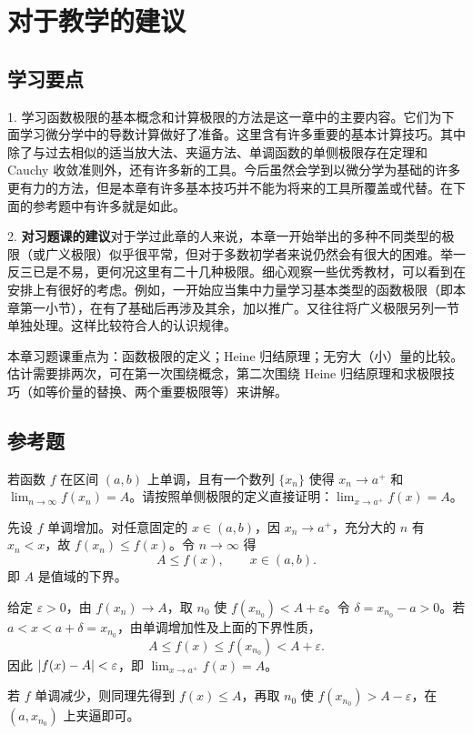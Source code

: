 \section{对于教学的建议}

\subsection{学习要点}

1. 学习函数极限的基本概念和计算极限的方法是这一章中的主要内容。它们为下面学习微分学中的导数计算做好了准备。这里含有许多重要的基本计算技巧。其中除了与过去相似的适当放大法、夹逼方法、单调函数的单侧极限存在定理和 Cauchy 收敛准则外，还有许多新的工具。今后虽然会学到以微分学为基础的许多更有力的方法，但是本章有许多基本技巧并不能为将来的工具所覆盖或代替。在下面的参考题中有许多就是如此。

2. \textbf{对习题课的建议}\quad 对于学过此章的人来说，本章一开始举出的多种不同类型的极限（或广义极限）似乎很平常，但对于多数初学者来说仍然会有很大的困难。举一反三已是不易，更何况这里有二十几种极限。细心观察一些优秀教材，可以看到在安排上有很好的考虑。例如，一开始应当集中力量学习基本类型的函数极限（即本章第一小节），在有了基础后再涉及其余，加以推广。又往往将广义极限另列一节单独处理。这样比较符合人的认识规律。

本章习题课重点为：函数极限的定义；Heine 归结原理；无穷大（小）量的比较。估计需要排两次，可在第一次围绕概念，第二次围绕 Heine 归结原理和求极限技巧（如等价量的替换、两个重要极限等）来讲解。

\subsection{参考题}

\begin{xreferenceproblem}[1]
若函数 $f$ 在区间 $(a,b)$ 上单调，且有一个数列 $\{x_n\}$ 使得 $x_n\to a^+$ 和 $\lim_{n\to\infty}f(x_n)=A$。请按照单侧极限的定义直接证明：$\lim_{x\to a^+}f(x)=A$。
\end{xreferenceproblem}
\begin{xsolution}
先设 $f$ 单调增加。对任意固定的 $x\in(a,b)$，因 $x_n\to a^+$，充分大的 $n$ 有 $x_n<x$，故
$f(x_n)\leq f(x)$。令 $n\to\infty$ 得
\[
  A\leq f(x),\qquad x\in(a,b).
\]
即 $A$ 是值域的下界。

给定 $\varepsilon>0$，由 $f(x_n)\to A$，取 $n_0$ 使
$f(x_{n_0})<A+\varepsilon$。令 $\delta=x_{n_0}-a>0$。若
$a<x<a+\delta=x_{n_0}$，由单调增加性及上面的下界性质，
\[
  A\leq f(x)\leq f(x_{n_0})<A+\varepsilon.
\]
因此 $\lvert f(x)-A\rvert<\varepsilon$，即 $\lim_{x\to a^+}f(x)=A$。

若 $f$ 单调减少，则同理先得到 $f(x)\leq A$，再取 $n_0$ 使
$f(x_{n_0})>A-\varepsilon$，在 $(a,x_{n_0})$ 上夹逼即可。
\end{xsolution}


